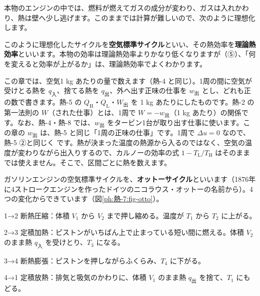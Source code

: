 \label{ph:熱-7:sec2}
本物のエンジンの中では、燃料が燃えてガスの成分が変わり、ガスは入れかわり、熱は壁へ少し逃げます。このままでは計算が難しいので、次のように理想化します。

\begin{phmodel}[空気標準サイクル]
\end{phmodel}

このように理想化したサイクルを\textbf{空気標準サイクル}といい、その熱効率を\textbf{理論熱効率}といいます。本物の効率は理論熱効率よりかなり低くなりますが（⑤）、「何を変えると効率が上がるか」は、理論熱効率でよくわかります。

この章では、空気1 kg あたりの量で数えます（熱-4 と同じ）。1周の間に空気が受けとる熱を $q_{\text{入}}$、捨てる熱を $q_{\text{出}}$、外へ出す正味の仕事を $w_{\text{出}}$ とし、どれも正の数で書きます。熱-5 の $Q_{\mathrm H}$・$Q_{\mathrm L}$・$W_{\text{出}}$ を 1 kg あたりにしたものです。熱-2 の第一法則の $W$（された仕事）とは、1周で $W=-w_{\text{出}}$（1 kg あたり）の関係です。なお、熱-4・熱-8 では、$w_{\text{出}}$ をタービン1台が取り出す仕事に使います。この章の $w_{\text{出}}$ は、熱-5 と同じ「1周の正味の仕事」です。1周で $\Delta u=0$ なので、熱-5 ②と同じく
です。熱が決まった温度の熱源から入るのではなく、空気の温度が変わりながら出入りするので、カルノーの効率の式 $1-T_{\mathrm L}/T_{\mathrm H}$ はそのままでは使えません。そこで、区間ごとに熱を数えます。

\label{ph:熱-7:sec3}
ガソリンエンジンの空気標準サイクルを、\textbf{オットーサイクル}といいます（1876年に4ストロークエンジンを作ったドイツのニコラウス・オットーの名前から）。4つの変化からできています（図\ref{ph:熱-7:fig-otto}）。
\begin{enumerate}[label={\bkcircled[bkBlue]{\arabic*}}, leftmargin=2.4\zw, itemsep=1pt, topsep=2pt]
\item 1→2 断熱圧縮：体積 $V_1$ から $V_2$ まで押し縮める。温度が $T_1$ から $T_2$ に上がる。
\item 2→3 定積加熱：ピストンがいちばん上で止まっている短い間に燃える。体積 $V_2$ のまま熱 $q_{\text{入}}$ を受けとり、$T_3$ になる。
\item 3→4 断熱膨張：ピストンを押しながらふくらみ、$T_4$ に下がる。
\item 4→1 定積放熱：排気と吸気のかわりに、体積 $V_1$ のまま熱 $q_{\text{出}}$ を捨て、$T_1$ にもどる。
\end{enumerate}

